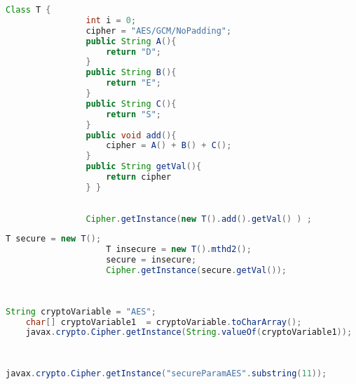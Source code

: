            \begin{lstlisting}[frame=tb,caption={\small Method Builder}, label={lst:methodbuilder},language=java]
                Class T {
                int i = 0;
                cipher = "AES/GCM/NoPadding";
                public String A(){
                    return "D";
                }
                public String B(){
                    return "E";
                }
                public String C(){
                    return "S";
                }
                public void add(){
                    cipher = A() + B() + C();
                }
                public String getVal(){
                    return cipher
                } }
        
        
                Cipher.getInstance(new T().add().getVal() ) ;
                \end{lstlisting}
                \vspace{-0.25em}
            

                \begin{lstlisting}[frame=tb,caption={\small Object Sensitive, using the object created in Listing A.1}, label={lst:ObjectSensitivity},language=java]
                    T secure = new T();
                    T insecure = new T().mthd2();
                    secure = insecure;
                    Cipher.getInstance(secure.getVal());
                    
                        
                    \end{lstlisting}
                    \vspace{-0.25em}

\begin{lstlisting}[frame=tb,caption={\small Build Variable}, label={lst:buildvariable},language=java]
    String cryptoVariable = "AES";
    char[] cryptoVariable1  = cryptoVariable.toCharArray();
    javax.crypto.Cipher.getInstance(String.valueOf(cryptoVariable1));
                        
                            
\end{lstlisting}
\vspace{-0.25em}

\begin{lstlisting}[frame=tb,caption={\small Substring}, label={lst:substring},language=java]
    javax.crypto.Cipher.getInstance("secureParamAES".substring(11));
                        
                            
\end{lstlisting}
\vspace{-0.25em}

